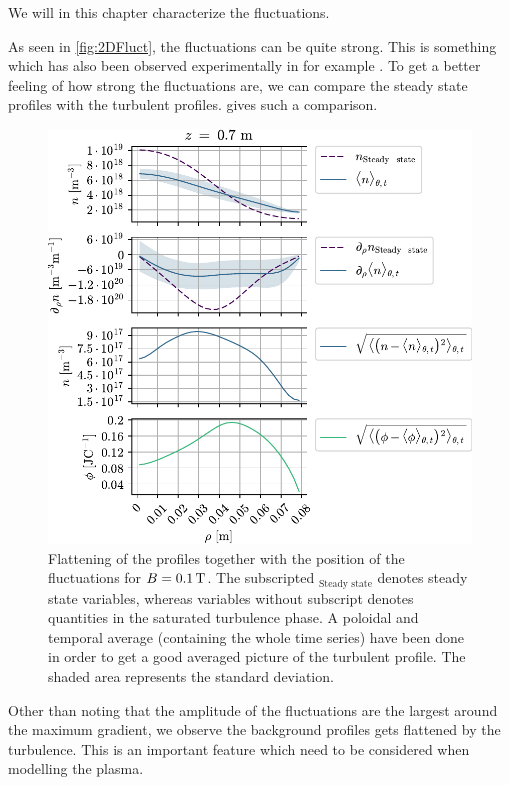 We will in this chapter characterize the fluctuations.

As seen in \cref{fig:2DFluct}, the fluctuations can be quite strong.
This is something which has also been observed experimentally in for example \cite{Burin2005}.
To get a better feeling of how strong the fluctuations are, we can compare the steady state profiles with the turbulent profiles.
 gives such a comparison.
%
\begin{figure}[h!]
    \begin{center}
        \includegraphics{fig/results/posOfFluct/posOfFluctB01}
    \end{center}
    \caption{Flattening of the profiles together with the position of the fluctuations for $B=0.1\, \text{T}$.
        The subscripted $_\text{Steady state}$ denotes steady state variables, whereas variables without subscript denotes quantities in the saturated turbulence phase.
        A poloidal and temporal average (containing the whole time series) have been done in order to get a good averaged picture of the turbulent profile.
        The shaded area represents the standard deviation.
    }
    \label{fig:posOfFluct01}
\end{figure}
%
Other than noting that the amplitude of the fluctuations are the largest around the maximum gradient, we observe the background profiles gets flattened by the turbulence.
This is an important feature which need to be considered when modelling the plasma.

